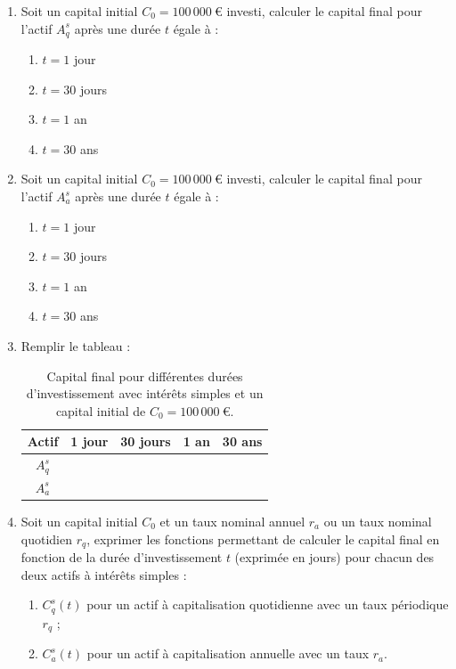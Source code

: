 \documentclass{article}
\begin{document}
\begin{enumerate}[label=\textbf{Q\arabic*.}]
    \item Soit un capital initial \( C_0 = 100\,000\ \text{€} \) investi, calculer le capital final pour l'actif \( A_q^s \) après une durée \( t \) égale à :
    \begin{enumerate}[label=(\alph*)]
        \item \( t = 1 \) jour
        \item \( t = 30 \) jours
        \item \( t = 1 \) an
        \item \( t = 30 \) ans
    \end{enumerate}

    \item Soit un capital initial \( C_0 = 100\,000\ \text{€} \) investi, calculer le capital final pour l'actif $A_a^s$ après une durée \( t \) égale à :
    \begin{enumerate}[label=(\alph*)]
        \item \( t = 1 \) jour
        \item \( t = 30 \) jours
        \item \( t = 1 \) an
        \item \( t = 30 \) ans
    \end{enumerate}
    
    \item Remplir le tableau :\\
    \begin{table}[h!]
        \centering
        \begin{tabular}{|c|c|c|c|c|}
        \hline
        \textbf{Actif} & \textbf{1 jour} & \textbf{30 jours} & \textbf{1 an} & \textbf{30 ans} \\
        \hline
        $A_q^s$ & & & & \\
        \hline
        $A_a^s$ & & & & \\
        \hline
        \end{tabular}
        \caption{Capital final pour différentes durées d'investissement avec intérêts simples et un capital initial de \( C_0 = 100\,000\ \text{€} \).}
        \label{tab:simple_interest_results}
    \end{table}


    \item Soit un capital initial \( C_0 \) et un taux nominal annuel \( r_a \) ou un taux nominal quotidien \( r_q \), exprimer les fonctions permettant de calculer le capital final en fonction de la durée d'investissement \( t \) (exprimée en jours) pour chacun des deux actifs à intérêts simples :
    \begin{enumerate}[label=(\alph*)]
        \item \( C^s_q(t) \) pour un actif à capitalisation quotidienne avec un taux périodique \( r_q \) ;
        \item \( C^s_a(t) \) pour un actif à capitalisation annuelle avec un taux \( r_a \).
    \end{enumerate}


\end{enumerate}
\end{document}
